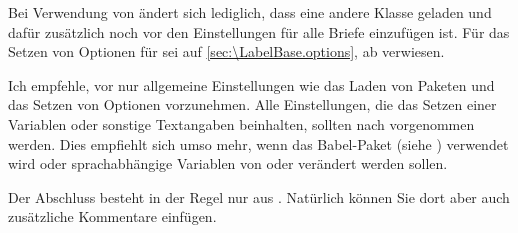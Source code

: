 Bei Verwendung von  ändert sich
lediglich, dass eine andere Klasse geladen und dafür zusätzlich
 noch vor den
Einstellungen für alle Briefe einzufügen ist. Für das Setzen von Optionen für
 sei auf \autoref{sec:\LabelBase.options}, ab
 verwiesen.

Ich empfehle, vor  nur allgemeine
Einstellungen wie das Laden von Paketen und das Setzen von Optionen
vorzunehmen. Alle Einstellungen, die das Setzen einer Variablen oder sonstige
Textangaben beinhalten, sollten nach 
vorgenommen werden. Dies empfiehlt sich umso mehr, wenn das
Babel-Paket (siehe \cite{package:babel}) verwendet wird
oder sprachabhängige Variablen von  oder 
verändert werden sollen.

Der Abschluss besteht in der Regel nur aus
. Natürlich können Sie dort aber auch
zusätzliche Kommentare einfügen.

